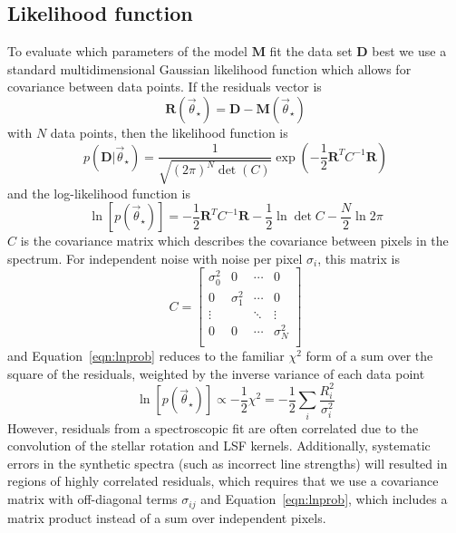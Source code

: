 \documentclass[iop,floatfix]{emulateapj}
\newcommand{\vt}{\vec{\theta}}
\newcommand{\vstar}{\vt_{\star}}
\newcommand{\fM}{ {\bm M}}
\newcommand{\fD}{ {\bm D}}
\newcommand{\fR}{ {\bm R}}
\begin{document}
\subsection{Likelihood function}
To evaluate which parameters of the model $\fM$ fit the data set $\fD$ best we use a standard multidimensional Gaussian likelihood function which allows for covariance between data points. If the residuals vector is 
\begin{equation}
  \fR(\vstar) = \fD - \fM(\vstar)
\end{equation}
with $N$ data points, then the likelihood function is
\begin{equation}
  p(\fD | \vstar) = \frac{1}{\sqrt{(2 \pi)^N \det(C)}} \exp\left ( -\frac{1}{2} \fR^T C^{-1} \fR \right ) 
\end{equation}
and the log-likelihood function is
\begin{equation}
    \ln[p(\vstar)] = -\frac{1}{2} \fR^T C^{-1} \fR - \frac{1}{2} \ln \det C  - \frac{N}{2} \ln 2 \pi 
    \label{eqn:lnprob}
\end{equation}
$C$ is the covariance matrix which describes the covariance between pixels in the spectrum. For independent noise with noise per pixel $\sigma_i$, this matrix is
\begin{equation}
  C = 
  \begin{bmatrix}
    \sigma_0^2 & 0  & \cdots & 0\\
    0 & \sigma_1^2 & \cdots & 0\\
    \vdots  &   & \ddots  & \vdots \\
    0 & 0 & \cdots & \sigma_N^2\\
  \end{bmatrix}
\end{equation}
and Equation~\ref{eqn:lnprob} reduces to the familiar $\chi^2$ form of a sum over the square of the residuals, weighted by the inverse variance of each data point
\begin{equation}
  \ln[p(\vstar)] \propto - \frac{1}{2} \chi^2 = - \frac{1}{2} \sum_i \frac{R_i^2}{\sigma_i^2}
\end{equation}
However, residuals from a spectroscopic fit are often correlated due to the convolution of the stellar rotation and LSF kernels. Additionally, systematic errors in the synthetic spectra (such as incorrect line strengths) will resulted in regions of highly correlated residuals, which requires that we use a covariance matrix with off-diagonal terms $\sigma_{ij}$ and Equation~\ref{eqn:lnprob}, which includes a matrix product instead of a sum over independent pixels.
\end{document}
